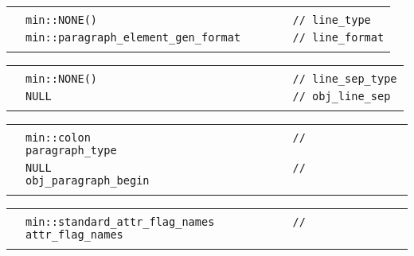 \documentclass[12pt]{article}
\newenvironment{indpar}[1][0.3in]%
	{\begin{list}{}%
		     {\setlength{\itemsep}{0in}%
		      \setlength{\topsep}{0in}%
		      \setlength{\parsep}{1ex}%
		      \setlength{\labelwidth}{#1}%
		      \setlength{\leftmargin}{#1}%
		      \addtolength{\leftmargin}{\labelsep}}%
	 \item}%
	{\end{list}}
\newlength{\ARGBREAKLENGTH}
\newcommand{\ARGBREAK}[1][\ARGBREAKLENGTH]{\\&\hspace*{#1}}
\begin{document}
\begin{indpar}[1em]
\vspace{-4ex}\begin{tabular}{r@{}l}\hspace*{0.1in}\ARGBREAK
\verb|min::NONE()                              // line_type|\ARGBREAK
\verb|min::paragraph_element_gen_format        // line_format|\ARGBREAK
\end{tabular}

\vspace{-4ex}\begin{tabular}{r@{}l}\hspace*{0.1in}\ARGBREAK
\verb|min::NONE()                              // line_sep_type|\ARGBREAK
\verb|NULL                                     // obj_line_sep|\ARGBREAK
\end{tabular}

\vspace{-4ex}\begin{tabular}{r@{}l}\hspace*{0.1in}\ARGBREAK
\verb|min::colon                               // paragraph_type|\ARGBREAK
\verb|NULL                                     // obj_paragraph_begin|\ARGBREAK
\end{tabular}

\vspace{-4ex}\begin{tabular}{r@{}l}\hspace*{0.1in}\ARGBREAK
\verb|min::standard_attr_flag_names            // attr_flag_names|\ARGBREAK
\end{tabular}\end{indpar}
\end{document}
